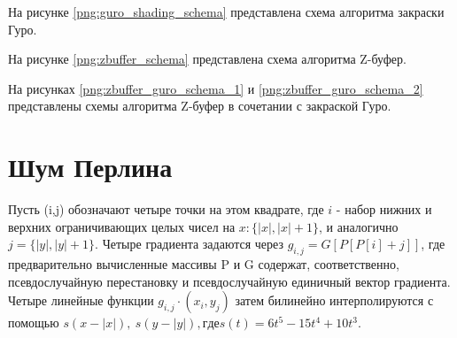 \begin{figure}[H]
\end{figure}

\newpage
На рисунке \ref{png:guro_shading_schema} представлена схема алгоритма закраски Гуро.
\begin{figure}[H]
\end{figure}

На рисунке \ref{png:zbuffer_schema} представлена схема алгоритма Z-буфер.
\begin{figure}[H]
\end{figure}

На рисунках \ref{png:zbuffer_guro_schema_1} и \ref{png:zbuffer_guro_schema_2} представлены схемы алгоритма Z-буфер в сочетании с закраской Гуро.
\begin{figure}[H]
\end{figure}

\begin{figure}[H]
\end{figure}

\section{Шум Перлина}
Пусть (i,j) обозначают четыре точки на этом квадрате, где $i$ - набор нижних и верхних ограничивающих целых чисел на $x: \{|x|,|x| + 1\}$, и аналогично $j = \{|y|,|y| + 1\}$. Четыре градиента задаются через $g_{i,j} = G[P[P[i]+j]]$, где предварительно вычисленные массивы P и G содержат, соответственно, псевдослучайную перестановку и псевдослучайную единичный вектор градиента. Четыре линейные функции $g_{i,j} · (x_{i}, y_{j})$ затем билинейно интерполируются с помощью $s(x-|x|),\ s(y-|y|), где s(t) = 6t^5 - 15t^4 + 10t^3$.

